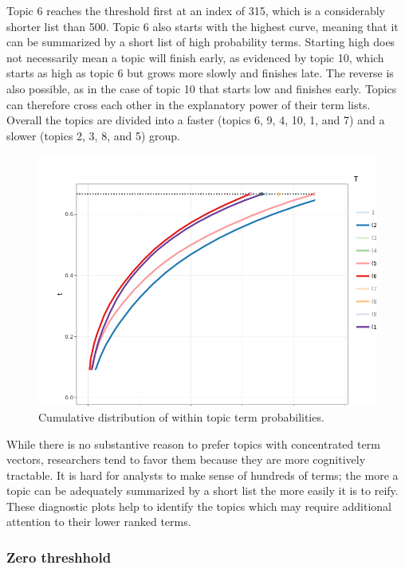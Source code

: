 \documentclass[]{book}
\theoremstyle{definition}
\theoremstyle{definition}
\theoremstyle{definition}
\theoremstyle{remark}
\begin{document}
Topic 6 reaches the threshold first at an index of 315, which is a
considerably shorter list than 500. Topic 6 also starts with the highest
curve, meaning that it can be summarized by a short list of high
probability terms. Starting high does not necessarily mean a topic will
finish early, as evidenced by topic 10, which starts as high as topic 6
but grows more slowly and finishes late. The reverse is also possible,
as in the case of topic 10 that starts low and finishes early. Topics
can therefore cross each other in the explanatory power of their term
lists. Overall the topics are divided into a faster (topics 6, 9, 4, 10,
1, and 7) and a slower (topics 2, 3, 8, and 5) group.

\begin{figure}

{\centering \includegraphics[width=0.9\linewidth]{03_files/figure-latex/elbow1p-1} 

}

\caption{Cumulative distribution of within topic term probabilities.}\label{fig:elbow1p}
\end{figure}

While there is no substantive reason to prefer topics with concentrated
term vectors, researchers tend to favor them because they are more
cognitively tractable. It is hard for analysts to make sense of hundreds
of terms; the more a topic can be adequately summarized by a short list
the more easily it is to reify. These diagnostic plots help to identify
the topics which may require additional attention to their lower ranked
terms.

\hypertarget{zero-threshhold}{%
\subsubsection{Zero threshhold}\label{zero-threshhold}}
\end{document}
